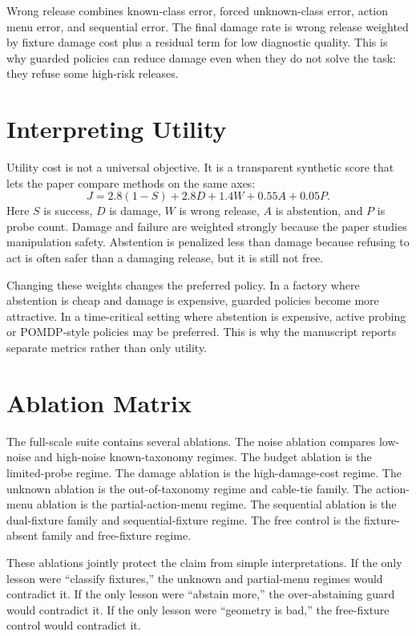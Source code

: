 \documentclass{article}
\begin{document}
Wrong release combines known-class error, forced unknown-class error, action
menu error, and sequential error. The final damage rate is wrong release
weighted by fixture damage cost plus a residual term for low diagnostic
quality. This is why guarded policies can reduce damage even when they do not
solve the task: they refuse some high-risk releases.

\section{Interpreting Utility}

Utility cost is not a universal objective. It is a transparent synthetic score
that lets the paper compare methods on the same axes:
\[
J = 2.8(1-S) + 2.8D + 1.4W + 0.55A + 0.05P.
\]
Here $S$ is success, $D$ is damage, $W$ is wrong release, $A$ is abstention,
and $P$ is probe count. Damage and failure are weighted strongly because the
paper studies manipulation safety. Abstention is penalized less than damage
because refusing to act is often safer than a damaging release, but it is still
not free.

Changing these weights changes the preferred policy. In a factory where
abstention is cheap and damage is expensive, guarded policies become more
attractive. In a time-critical setting where abstention is expensive, active
probing or POMDP-style policies may be preferred. This is why the manuscript
reports separate metrics rather than only utility.

\section{Ablation Matrix}

The full-scale suite contains several ablations. The noise ablation compares
low-noise and high-noise known-taxonomy regimes. The budget ablation is the
limited-probe regime. The damage ablation is the high-damage-cost regime. The
unknown ablation is the out-of-taxonomy regime and cable-tie family. The
action-menu ablation is the partial-action-menu regime. The sequential
ablation is the dual-fixture family and sequential-fixture regime. The free
control is the fixture-absent family and free-fixture regime.

These ablations jointly protect the claim from simple interpretations. If the
only lesson were ``classify fixtures,'' the unknown and partial-menu regimes
would contradict it. If the only lesson were ``abstain more,'' the
over-abstaining guard would contradict it. If the only lesson were ``geometry
is bad,'' the free-fixture control would contradict it.
\end{document}
